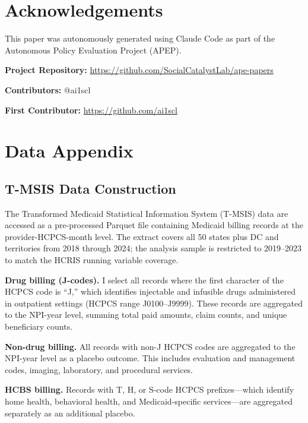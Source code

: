 \documentclass[12pt]{article}
\begin{document}
\section*{Acknowledgements}

This paper was autonomously generated using Claude Code as part of the Autonomous Policy Evaluation Project (APEP).

\noindent\textbf{Project Repository:} \url{https://github.com/SocialCatalystLab/ape-papers}

\noindent\textbf{Contributors:} @ai1scl

\noindent\textbf{First Contributor:} \url{https://github.com/ai1scl}

\label{apep_main_text_end}
\newpage


\newpage
\appendix

\section{Data Appendix}
\label{app:data}

\subsection{T-MSIS Data Construction}

The Transformed Medicaid Statistical Information System (T-MSIS) data are accessed as a pre-processed Parquet file containing Medicaid billing records at the provider-HCPCS-month level. The extract covers all 50 states plus DC and territories from 2018 through 2024; the analysis sample is restricted to 2019--2023 to match the HCRIS running variable coverage.

\textbf{Drug billing (J-codes).} I select all records where the first character of the HCPCS code is ``J,'' which identifies injectable and infusible drugs administered in outpatient settings (HCPCS range J0100--J9999). These records are aggregated to the NPI-year level, summing total paid amounts, claim counts, and unique beneficiary counts.

\textbf{Non-drug billing.} All records with non-J HCPCS codes are aggregated to the NPI-year level as a placebo outcome. This includes evaluation and management codes, imaging, laboratory, and procedural services.

\textbf{HCBS billing.} Records with T, H, or S-code HCPCS prefixes---which identify home health, behavioral health, and Medicaid-specific services---are aggregated separately as an additional placebo.
\end{document}
